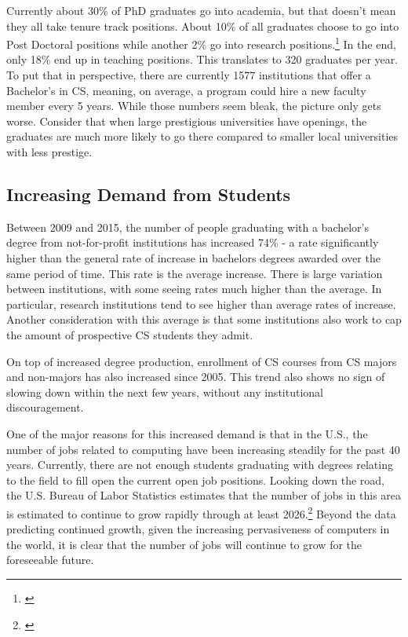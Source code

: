 \documentclass[12pt,twoside]{reedthesis}
\begin{document}
Currently about 30\% of PhD graduates go into academia, but that doesn't mean they all take tenure track positions. About 10\% of all graduates choose to go into Post Doctoral positions while another 2\% go into research positions.\footnote{\cite{zweben_another_2018}} In the end, only 18\% end up in teaching positions. This translates to 320 graduates per year. To put that in perspective, there are currently 1577 institutions that offer a Bachelor's in CS, meaning, on average, a program could hire a new faculty member every 5 years. While those numbers seem bleak, the picture only gets worse. Consider that when large prestigious universities have openings, the graduates are much more likely to go there compared to smaller local universities with less prestige. 

\subsection{Increasing Demand from Students}
Between 2009 and 2015, the number of people graduating with a bachelor's degree from not-for-profit institutions has increased 74\% - a rate significantly higher than the general rate of increase in bachelors degrees awarded over the same period of time. This rate is the average increase. There is large variation between institutions, with some seeing rates much higher than the average. In particular, research institutions tend to see higher than average rates of increase. Another consideration with this average is that some institutions also work to cap the amount of prospective CS students they admit. 

On top of increased degree production, enrollment of CS courses from CS majors and non-majors has also increased since 2005. This trend also shows no sign of slowing down within the next few years, without any institutional discouragement. 

One of the major reasons for this increased demand is that in the U.S.,  the number of jobs related to computing have been increasing steadily for the past 40 years. Currently, there are not enough students graduating with degrees relating to the field to fill open the current open job positions. Looking down the road, the U.S. Bureau of Labor Statistics estimates that the number of jobs in this area is estimated to continue to grow rapidly through at least 2026.\footnote{\cite{BLS}} Beyond the data predicting continued growth, given the increasing pervasiveness of computers in the world, it is clear that the number of jobs will continue to grow for the foreseeable future. 
\end{document}
